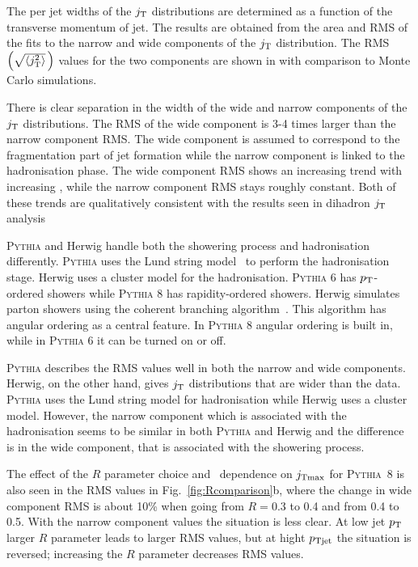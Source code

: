 The per jet  widths of the $j_{\rm T}$ distributions are determined as a function of the transverse momentum of jet. The results are obtained from the area and RMS of the fits to the narrow and wide components of the $j_{\rm T}$ distribution. The RMS $\left(\sqrt{\left<j_{\rm T}^2\right>}\,\right)$ values for the two components are shown in  with comparison to Monte Carlo simulations.

There is clear separation in the width of the wide and narrow components of the $j_{\rm T}$ distributions. The RMS of the wide component is 3-4 times larger than the narrow component RMS. The wide component is assumed to correspond to the fragmentation part of jet formation while the narrow component is linked to the hadronisation phase. The wide component RMS shows an increasing trend with increasing \ptjet, while the narrow component RMS stays roughly constant. Both of these trends are qualitatively consistent with the results seen in dihadron $j_{\rm T}$ analysis~\cite{ALICEjt}

\textsc{Pythia} and Herwig handle both the showering process and hadronisation differently. \textsc{Pythia} uses the Lund string model~\cite{lundString} to perform the hadronisation stage. Herwig uses a cluster model for the hadronisation. \textsc{Pythia} 6 has $p_{\rm T}$-ordered showers while \textsc{Pythia} 8 has rapidity-ordered showers. Herwig simulates parton showers using the coherent branching algorithm~\cite{Gieseke:2003rz}. This algorithm has angular ordering as a central feature. In \textsc{Pythia} 8 angular ordering is built in, while in \textsc{Pythia} 6 it can be turned on or off.

\textsc{Pythia} describes the RMS values well in both the narrow and wide components. Herwig, on the other hand, gives $j_{\rm T}$ distributions that are wider than the data. \textsc{Pythia} uses the Lund string model for hadronisation while Herwig uses a cluster model. However, the narrow component which is associated with the hadronisation seems to be similar in both \textsc{Pythia} and Herwig and the difference is in the wide component, that is associated with the showering process.

The effect of the $R$ parameter choice and \ptjet\ dependence on $j_{\rm Tmax}$ for \textsc{Pythia}~8 is also seen in the RMS values in Fig.~\ref{fig:Rcomparison}b, where the change in wide component RMS is about 10\% when going from $R=0.3$ to 0.4 and from 0.4 to 0.5. With the narrow component values the situation is less clear. At low jet $p_{\rm T}$ larger $R$ parameter leads to larger RMS values, but at hight $p_{\rm Tjet}$ the situation is reversed; increasing the $R$ parameter decreases RMS values.





